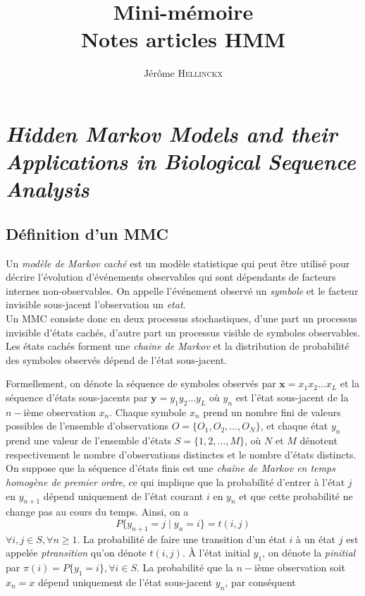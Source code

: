 \documentclass[a4paper, 11pt]{article}
\title{{Mini-mémoire}\\Notes articles HMM}
\author{Jérôme \textsc{Hellinckx}}
\begin{document}
\maketitle
\tableofcontents
\glsaddall
\printglossaries
\newpage
\section{\textit{Hidden Markov Models and their Applications in Biological Sequence Analysis}}
\subsection{Définition d'un MMC}
Un \textit{modèle de Markov caché} est un modèle statistique qui peut être utilisé pour décrire l'évolution d'événements observables qui sont dépendants de facteurs internes non-observables. On appelle l'événement observé un \textit{\gls{symbole}} et le facteur invisible sous-jacent l'observation un \textit{\gls{etat}}. 
\\Un MMC consiste donc en deux processus stochastiques, d'une part un processus invisible d'états cachés, d'autre part un processus visible de symboles observables. Les états cachés forment une \textit{\gls{chaine de Markov}} et la distribution de probabilité des symboles observés dépend de l'état sous-jacent. 
\\
\par
Formellement, on dénote la séquence de symboles observés par $\textbf{x} = x_1x_2\dotsc x_L $ et la séquence d'états sous-jacents par  $\textbf{y} = y_1y_2\dotsc y_L $ où $y_n$ est l'état sous-jacent de la $n-$ième observation $x_n$.
Chaque symbole $x_n$ prend un nombre fini de valeurs possibles de l'ensemble d'observations $O=\{O_1,O_2,\dotsc ,O_N\}$, et chaque état $y_n$ prend une valeur de l'ensemble d'états $S=\{1,2,\dotsc ,M\}$, où $N$ et $M$ dénotent respectivement le nombre d'observations distinctes et le nombre d'états distincts.
\\
On suppose que la séquence d'états finis est une \textit{chaîne de Markov en temps homogène de premier ordre}, ce qui implique que la probabilité d'entrer à l'état $j$ en $y_{n+1}$ dépend uniquement de l'état courant $i$ en $y_n$ et que cette probabilité ne change pas au cours du temps. Ainsi, on a
\begin{equation}
P\{y_{n+1}=j\mid y_n=i\}=t(i,j)
\end{equation}
$\forall i,j\in S, \forall n\geq 1$. La probabilité de faire une transition d'un état $i$ à un état $j$ est appelée \textit{\gls{ptransition}} qu'on dénote $t(i,j)$. À l'état initial $y_1$, on dénote la \textit{\gls{pinitial}} par $\pi (i)=P\{y_1=i\},\forall i\in S$. La probabilité que la $n-$ième observation soit $x_n=x$ dépend uniquement de l'état sous-jacent $y_n$, par conséquent 
\end{document}
